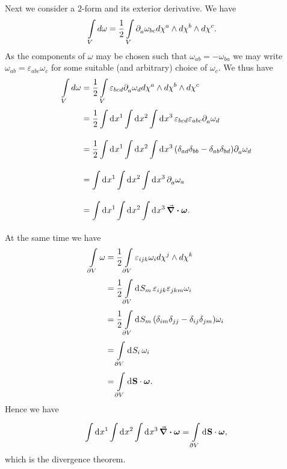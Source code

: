 Next we consider a $2$-form and its exterior derivative. We have
\begin{align*}
\int\limits_{V}d\omega &= \frac{1}{2}\int\limits_{V}\partial^{}_{a}\omega_{bc}d\chi^{a}\wedge d\chi^{b}\wedge d\chi^{c}.
\end{align*}
As the components of $\omega$ may be chosen such that $\omega_{ab} = -\omega_{ba}$ we may write $\omega_{ab} = \varepsilon_{abc}\omega_{c}$ for some suitable (and arbitrary) choice of $\omega_{c}$. We thus have
\begin{align*}
\int\limits_{V}d\omega &= \frac{1}{2}\int\limits_{V}\varepsilon_{bcd}\partial^{}_{a}\omega_{d}d\chi^{a}\wedge d\chi^{b}\wedge d\chi^{c} \\
&= \frac{1}{2}\int\limits_{}^{}\dd[]{x^{1}}\int\limits_{}^{}\dd[]{x^{2}}\int\limits_{}^{}\dd[]{x^{3}}\varepsilon_{bcd}\varepsilon_{abc}\partial^{}_{a}\omega_{d} \\
&= \frac{1}{2}\int\limits_{}^{}\dd[]{x^{1}}\int\limits_{}^{}\dd[]{x^{2}}\int\limits_{}^{}\dd[]{x^{3}}(\delta_{ad}\delta_{bb} - \delta_{ab}\delta_{bd})\partial^{}_{a}\omega_{d} \\
&= \int\limits_{}^{}\dd[]{x^{1}}\int\limits_{}^{}\dd[]{x^{2}}\int\limits_{}^{}\dd[]{x^{3}}\partial^{}_{a}\omega_{a} \\
&= \int\limits_{}^{}\dd[]{x^{1}}\int\limits_{}^{}\dd[]{x^{2}}\int\limits_{}^{}\dd[]{x^{3}}\div{\vb*{\omega}}.
\end{align*}
At the same time we have
\begin{align*}
\int\limits_{\partial V}\omega &= \frac{1}{2}\int\limits_{\partial V}\varepsilon_{ijk}\omega_{i}d\chi^{j}\wedge d\chi^{k} \\
&= \frac{1}{2}\int\limits_{\partial V}^{}\dd[]{S_{m}}\varepsilon_{ijk}\varepsilon_{jkm}\omega_{i} \\
&= \frac{1}{2}\int\limits_{\partial V}^{}\dd[]{S_{m}}(\delta_{im}\delta_{jj} - \delta_{ij}\delta_{jm})\omega_{i} \\
&= \int\limits_{\partial V}^{}\dd[]{S_{i}}\omega_{i} \\
&= \int\limits_{\partial V}^{}\dd[]{\vb{S}}\cdot\vb*{\omega}.
\end{align*}
Hence we have
\begin{align*}
\int\limits_{}^{}\dd[]{x^{1}}\int\limits_{}^{}\dd[]{x^{2}}\int\limits_{}^{}\dd[]{x^{3}}\div{\vb*{\omega}} = \int\limits_{\partial V}^{}\dd[]{\vb{S}}\cdot\vb*{\omega},
\end{align*}
which is the divergence theorem.

